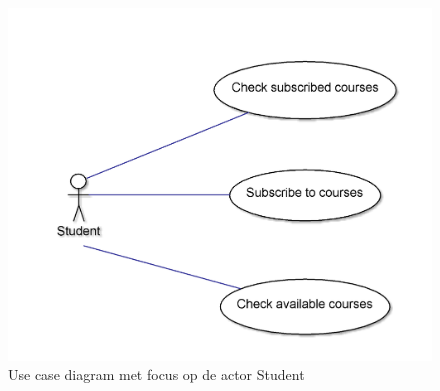 \begin{figure}[H]
	\centering
	\includegraphics[scale=0.2]{img/useCaseStudent}
	\caption{Use case diagram met focus op de actor Student}
	\label{fig:useCaseStudent}
\end{figure}